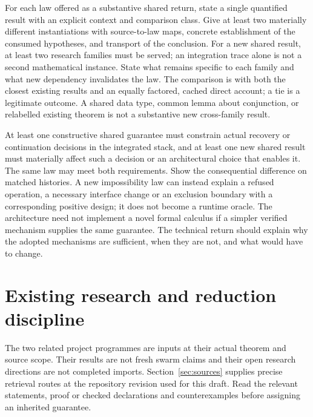 \documentclass[11pt]{article}
\begin{document}
For each law offered as a substantive shared return, state a single quantified result with an explicit context and comparison class. Give at least two materially different instantiations with source-to-law maps, concrete establishment of the consumed hypotheses, and transport of the conclusion. For a new shared result, at least two research families must be served; an integration trace alone is not a second mathematical instance. State what remains specific to each family and what new dependency invalidates the law. The comparison is with both the closest existing results and an equally factored, cached direct account; a tie is a legitimate outcome. A shared data type, common lemma about conjunction, or relabelled existing theorem is not a substantive new cross-family result.

At least one constructive shared guarantee must constrain actual recovery or continuation decisions in the integrated stack, and at least one new shared result must materially affect such a decision or an architectural choice that enables it. The same law may meet both requirements. Show the consequential difference on matched histories. A new impossibility law can instead explain a refused operation, a necessary interface change or an exclusion boundary with a corresponding positive design; it does not become a runtime oracle. The architecture need not implement a novel formal calculus if a simpler verified mechanism supplies the same guarantee. The technical return should explain why the adopted mechanisms are sufficient, when they are not, and what would have to change.

\section{Existing research and reduction discipline}\label{sec:imports}
The two related project programmes are inputs at their actual theorem and source scope. Their results are not fresh swarm claims and their open research directions are not completed imports. Section~\ref{sec:sources} supplies precise retrieval routes at the repository revision used for this draft. Read the relevant statements, proof or checked declarations and counterexamples before assigning an inherited guarantee.
\end{document}
